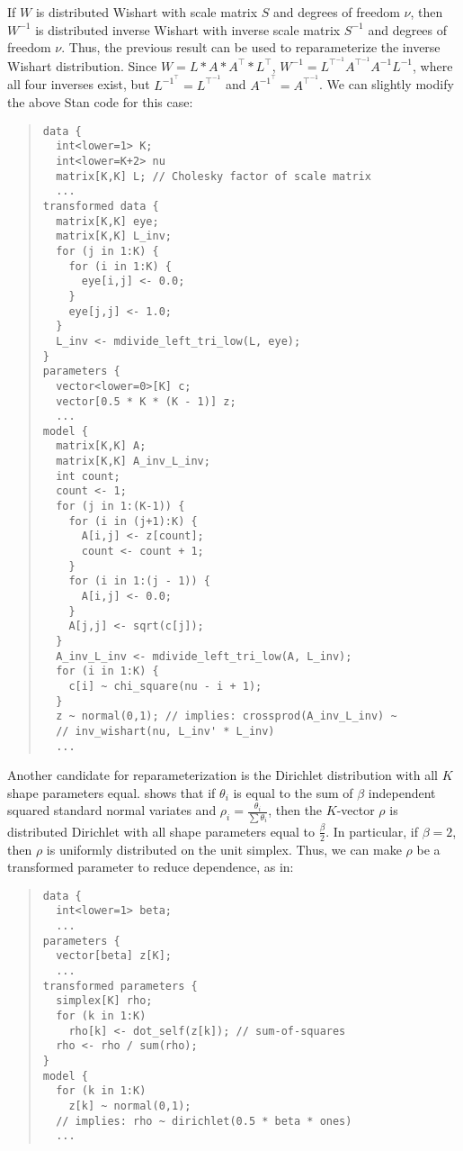 If $W$ is distributed Wishart with scale matrix $S$ and degrees of
freedom $\nu$, then $W^{-1}$ is distributed inverse Wishart with inverse
scale matrix $S^{-1}$ and degrees of freedom $\nu$. Thus, the previous
result can be used to reparameterize the inverse Wishart distribution.
Since $W = L * A * A^{\top} * L^{\top}$, 
$W^{-1} = L^{{\top}^{-1}} A^{{\top}^{-1}} A^{-1} L^{-1}$, where all four
inverses exist, but 
$L^{{-1}^{\top}} = L^{{\top}^{-1}}$ and $A^{{-1}^{\top}} = A^{{\top}^{-1}}$.
We can slightly modify the above Stan code for this case:
%
\begin{quote}
\begin{Verbatim}[fontsize=\small]
data {
  int<lower=1> K;
  int<lower=K+2> nu
  matrix[K,K] L; // Cholesky factor of scale matrix
  ...
transformed data {
  matrix[K,K] eye;
  matrix[K,K] L_inv;
  for (j in 1:K) {
    for (i in 1:K) {
      eye[i,j] <- 0.0;
    }
    eye[j,j] <- 1.0;
  }
  L_inv <- mdivide_left_tri_low(L, eye);
}
parameters {
  vector<lower=0>[K] c;
  vector[0.5 * K * (K - 1)] z;
  ...
model {
  matrix[K,K] A;
  matrix[K,K] A_inv_L_inv;  
  int count;
  count <- 1;
  for (j in 1:(K-1)) {
    for (i in (j+1):K) {
      A[i,j] <- z[count];
      count <- count + 1;
    }
    for (i in 1:(j - 1)) {
      A[i,j] <- 0.0;
    }
    A[j,j] <- sqrt(c[j]);
  }
  A_inv_L_inv <- mdivide_left_tri_low(A, L_inv);
  for (i in 1:K) {
    c[i] ~ chi_square(nu - i + 1);
  }
  z ~ normal(0,1); // implies: crossprod(A_inv_L_inv) ~ 
  // inv_wishart(nu, L_inv' * L_inv)
  ...
\end{Verbatim}
\end{quote}
%
Another candidate for reparameterization is the Dirichlet distribution
with all $K$ shape parameters equal. \cite{ZyczkowskiSommers:2001} shows 
that if $\theta_i$ is equal to the sum of $\beta$ independent squared 
standard normal variates and $\rho_i = \frac{\theta_i}{\sum \theta_i}$, 
then the $K$-vector $\rho$ is distributed Dirichlet with all shape 
parameters equal to $\frac{\beta}{2}$. In particular, if $\beta = 2$, 
then $\rho$ is uniformly distributed on the unit simplex. Thus, we can 
make $\rho$ be a transformed parameter to reduce dependence, as in:
%
\begin{quote}
\begin{Verbatim}[fontsize=\small]
data {
  int<lower=1> beta;
  ...
parameters {
  vector[beta] z[K];
  ...
transformed parameters {
  simplex[K] rho;
  for (k in 1:K)
    rho[k] <- dot_self(z[k]); // sum-of-squares
  rho <- rho / sum(rho);
}
model {
  for (k in 1:K)
    z[k] ~ normal(0,1); 
  // implies: rho ~ dirichlet(0.5 * beta * ones)
  ...
\end{Verbatim}
\end{quote}
%

